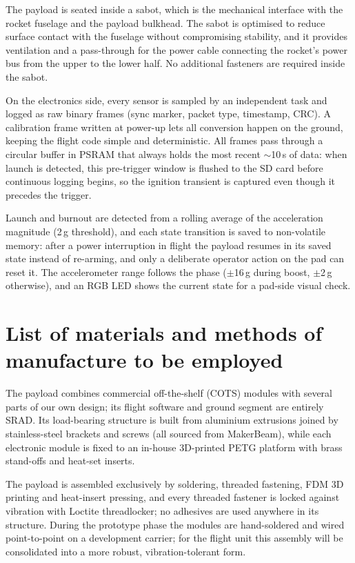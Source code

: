 The payload is seated inside a sabot, which is the mechanical interface with the rocket fuselage and the payload bulkhead. The sabot is optimised to reduce surface contact with the fuselage without compromising stability, and it provides ventilation and a pass-through for the power cable connecting the rocket's power bus from the upper to the lower half. No additional fasteners are required inside the sabot.

On the electronics side, every sensor is sampled by an independent task and logged as raw binary frames (sync marker, packet type, timestamp, CRC). A calibration frame written at power-up lets all conversion happen on the ground, keeping the flight code simple and deterministic. All frames pass through a circular buffer in PSRAM that always holds the most recent $\sim$10\,s of data: when launch is detected, this pre-trigger window is flushed to the SD card before continuous logging begins, so the ignition transient is captured even though it precedes the trigger.

Launch and burnout are detected from a rolling average of the acceleration magnitude (2\,g threshold), and each state transition is saved to non-volatile memory: after a power interruption in flight the payload resumes in its saved state instead of re-arming, and only a deliberate operator action on the pad can reset it. The accelerometer range follows the phase ($\pm$16\,g during boost, $\pm$2\,g otherwise), and an RGB LED shows the current state for a pad-side visual check.


\chapter{List of materials and methods of manufacture to be employed}

The payload combines commercial off-the-shelf (COTS) modules with several parts of our own design; its flight software and ground segment are entirely
SRAD. Its load-bearing structure is built from aluminium extrusions joined by stainless-steel brackets and screws (all sourced from MakerBeam), while each
electronic module is fixed to an in-house 3D-printed PETG platform with brass stand-offs and heat-set inserts.

The payload is assembled exclusively by soldering, threaded fastening, FDM 3D printing and heat-insert pressing, and every threaded fastener is locked against vibration with Loctite threadlocker; no adhesives are used anywhere in its structure. During the prototype phase the modules are hand-soldered and wired point-to-point on a development carrier; for the flight unit this assembly will be consolidated into a more robust, vibration-tolerant form.

